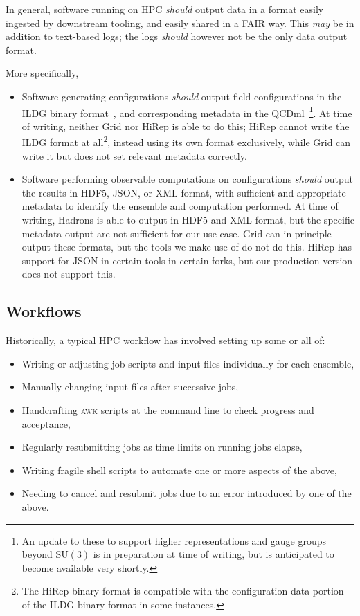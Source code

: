 \documentclass{article}
\newcommand\rfcword[1]{\emph{#1}\xspace}
\newcommand\should{\rfcword{should}}
\newcommand\may{\rfcword{may}}
\newcommand\program[1]{\textsc{#1}\xspace}
\begin{document}
In general,
software running on HPC \should output data in a format easily ingested by downstream tooling,
and easily shared in a FAIR way.
This \may be in addition to text-based logs;
the logs \should however not be the only data output format.

More specifically,
\begin{itemize}
  \item
        Software generating configurations
        \should output field configurations in the ILDG binary format~\cite{ildg-binary},
        and corresponding metadata in the QCDml~\cite{Maynard:2004wg}\footnote{
        An update to these to support
        higher representations and gauge groups beyond $\mathrm{SU}(3)$
        is in preparation at time of writing,
        but is anticipated to become available very shortly.
        }.
        At time of writing,
        neither Grid nor HiRep is able to do this;
        HiRep cannot write the ILDG format at all\footnote{
          The HiRep binary format is compatible with
          the configuration data portion of the ILDG binary format
          in some instances.
        },
        instead using its own format exclusively,
        while Grid can write it but does not set relevant metadata correctly.
  \item
        Software performing observable computations on configurations
        \should output the results in HDF5, JSON, or XML format,
        with sufficient and appropriate metadata to identify the ensemble and computation performed.
        At time of writing,
        Hadrons is able to output in HDF5 and XML format,
        but the specific metadata output are not sufficient for our use case.
        Grid can in principle output these formats,
        but the tools we make use of do not do this.
        HiRep has support for JSON in certain tools in certain forks,
        but our production version does not support this.
\end{itemize}


\subsection{Workflows}

Historically,
a typical HPC workflow has involved setting up some or all of:

\begin{itemize}
  \item
        Writing or adjusting job scripts and input files individually for each ensemble,
  \item
        Manually changing input files after successive jobs,
  \item
        Handcrafting \program{awk} scripts at the command line to check progress and acceptance,
  \item
        Regularly resubmitting jobs as time limits on running jobs elapse,
  \item
        Writing fragile shell scripts to automate one or more aspects of the above,
  \item
        Needing to cancel and resubmit jobs due to an error introduced by one of the above.
\end{itemize}
\end{document}
